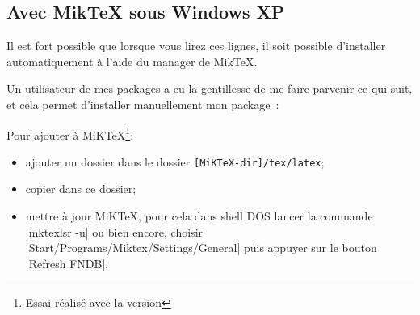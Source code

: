 
\vfill
\newpage
\subsection{Avec MikTeX sous Windows XP}

Il est fort possible que lorsque vous lirez ces lignes, il soit possible d'installer  automatiquement à l'aide du manager de MikTeX.

Un utilisateur de mes packages  a eu la gentillesse de me faire parvenir ce qui suit, et cela permet d'installer manuellement mon package~:

Pour ajouter  à MiKTeX\footnote{Essai réalisé avec la version }:

\begin{itemize}\setlength{\itemsep}{10pt}
  \item ajouter un dossier  dans le dossier
       \colorbox{blue!30}{\texttt{[MiKTeX-dir]/tex/latex}};
  \item copier  dans ce dossier;
  \item mettre à jour  MiKTeX, pour cela dans shell DOS lancer la commande   \colorbox{red!30}{|mktexlsr -u|}  ou bien encore, choisir \colorbox{red!30}{|Start/Programs/Miktex/Settings/General|}
puis appuyer sur le bouton  \colorbox{red!30}{|Refresh FNDB|}.
\end{itemize}


\endinput

